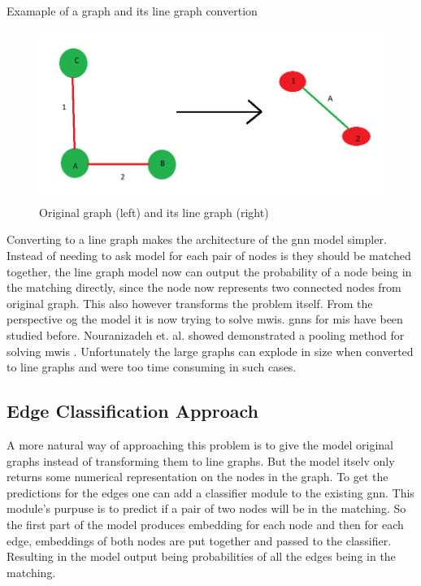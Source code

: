 Examaple of a graph and its line graph convertion
\begin{figure}[H]
    \centering
    \includegraphics[scale=0.5]{figures/LineGraphExample}
    \caption{Original graph (left) and its line graph (right)}
    \label{Line graph figure}
\end{figure}

Converting to a line graph makes the architecture of the \gls{gnn} model simpler. Instead of needing to ask model for each pair of nodes is they should be matched together, the line graph model now can output the probability of a node being in the matching directly, since the node now represents two connected nodes from original graph. This also however transforms the problem itself. From the perspective og the model it is now trying to solve \gls{mwis}. \gls{gnn}s for \gls{mis} have been studied before. Nouranizadeh et. al. showed demonstrated a pooling method for solving \gls{mwis} \cite{DBLPjournals/corr/abs-2107-01410}. Unfortunately the large graphs can explode in size when converted to line graphs and were too time consuming in such cases.

\subsection{Edge Classification Approach}

A more natural way of approaching this problem is to give the model original graphs instead of transforming them to line graphs. But the model itselv only returns some numerical representation on the nodes in the graph. To get the predictions for the edges one can add a classifier module to the existing \gls{gnn}. This module's purpuse is to predict if a pair of two nodes will be in the matching. So the first part of the model produces embedding for each node and then for each edge, embeddings of both nodes are put together and passed to the classifier. Resulting in the model output being probabilities of all the edges being in the matching.

